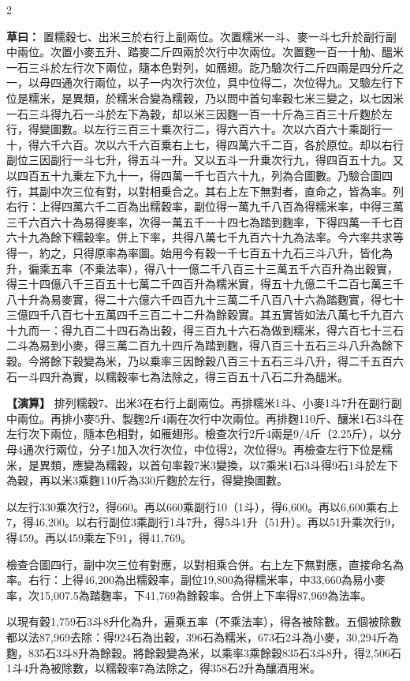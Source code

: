 \documentclass[11pt,a4paper]{article}
\newcommand{\ClassicalWorking}[1]{\par\noindent\textbf{草曰：}#1\par}
\newcommand{\ModernWorking}[1]{\par\noindent\textbf{【演算】}#1\par}
\begin{document}
\begin{paracol}{2}

\ClassicalWorking{%
置糯穀七、出米三於右行上副兩位。次置糯米一斗、麥一斗七升於副行副中兩位。次置小麥五升、踏麥二斤四兩於次行中次兩位。次置麴一百一十觔、醞米一石三斗於左行次下兩位，隨本色對列，如鴈翅。訖乃驗次行二斤四兩是四分斤之一，以母四通次行兩位，以子一内次行次位，具中位得二，次位得九。又驗左行下位是糯米，是異類，於糯米合變為糯穀，乃以問中首句率穀七米三變之，以七因米一石三斗得九石一斗於左下為穀，却以米三因麴一百一十斤為三百三十斤麴於左行，得變圖數。以左行三百三十乗次行二，得六百六十。次以六百六十乘副行一十，得六千六百。次以六千六百乗右上七，得四萬六千二百，各於原位。却以右行副位三因副行一斗七升，得五斗一升。又以五斗一升乗次行九，得四百五十九。又以四百五十九乗左下九十一，得四萬一千七百六十九，列為合圖數。乃驗合圖四行，其副中次三位有對，以對相乗合之。其右上左下無對者，直命之，皆為率。列右行：上得四萬六千二百為出糯穀率，副位得一萬九千八百為得糯米率，中得三萬三千六百六十為易得麥率，次得一萬五千一十四七為踏到麴率，下得四萬一千七百六十九為餘下糯榖率。併上下率，共得八萬七千九百六十九為法率。今六率共求等得一，約之，只得原率為率圖。始用今有穀一千七百五十九石三斗八升，皆化為升，徧乘五率（不乗法率），得八十一億二千八百三十三萬五千六百升為出穀實，得三十四億八千三百五十七萬二千四百升為糯米實，得五十九億二千二百七萬三千八十升為易麥實，得二十六億六千四百九十三萬二千八百八十六為踏麴實，得七十三億四千八百七十五萬四千三百二十二升為餘穀實。其五實皆如法八萬七千九百六十九而一：得九百二十四石為出穀，得三百九十六石為做到糯米，得六百七十三石二斗為易到小麥，得三萬二百九十四斤為踏到麴，得八百三十五石三斗八升為餘下穀。今將餘下穀變為米，乃以乗率三因餘穀八百三十五石三斗八升，得二千五百六石一斗四升為實，以糯穀率七為法除之，得三百五十八石二升為醞米。}

\switchcolumn

\ModernWorking{%
排列糯穀7、出米3在右行上副兩位。再排糯米1斗、小麥1斗7升在副行副中兩位。再排小麥5升、製麴2斤4兩在次行中次兩位。再排麴110斤、釀米1石3斗在左行次下兩位，隨本色相對，如雁翅形。檢查次行2斤4兩是9/4斤（2.25斤），以分母4通次行兩位，分子1加入次行次位，中位得2，次位得9。再檢查左行下位是糯米，是異類，應變為糯穀，以首句率穀7米3變換，以7乘米1石3斗得9石1斗於左下為穀，再以米3乘麴110斤為330斤麴於左行，得變換圖數。

以左行330乘次行2，得660。再以660乘副行10（1斗），得6,600。再以6,600乘右上7，得46,200。以右行副位3乘副行1斗7升，得5斗1升（51升）。再以51升乘次行9，得459。再以459乘左下91，得41,769。

檢查合圖四行，副中次三位有對應，以對相乘合併。右上左下無對應，直接命名為率。右行：上得46,200為出糯穀率，副位19,800為得糯米率，中33,660為易小麥率，次15,007.5為踏麴率，下41,769為餘穀率。合併上下率得87,969為法率。

以現有穀1,759石3斗8升化為升，遍乘五率（不乘法率），得各被除數。五個被除數都以法87,969去除：得924石為出穀，396石為糯米，673石2斗為小麥，30,294斤為麴，835石3斗8升為餘穀。將餘穀變為米，以乘率3乘餘穀835石3斗8升，得2,506石1斗4升為被除數，以糯穀率7為法除之，得358石2升為釀酒用米。
}

\end{paracol}
\end{document}
